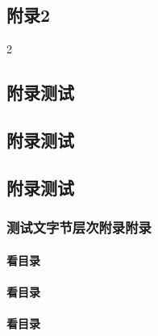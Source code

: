 \begin{Appendix}

\chapter{附录2}


\begin{paracol}{2}
\lipsum
\end{paracol}


\section{附录测试}







	

\section{附录测试}



\begin{Appendix*}
\section{附录测试}

\makeatletter
{}
\makeatother




\subsection{测试文字节层次附录附录}

\subsubsection{看目录}

\subsubsection{看目录}

\subsubsection*{看目录}



\end{Appendix*}
\end{Appendix}
